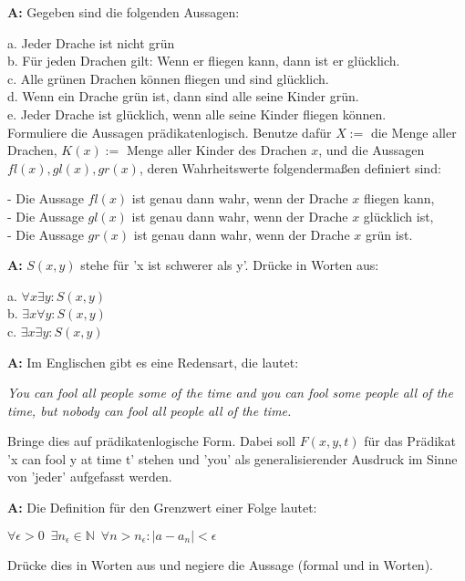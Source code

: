 \documentclass[landscape,twocolumn,a4paper]{article}
\begin{document}
 

\textbf{A:} 
Gegeben sind die folgenden Aussagen:

a. Jeder Drache ist nicht grün \\
b. Für jeden Drachen gilt: Wenn er fliegen kann, dann ist er glücklich. \\
c. Alle grünen Drachen können fliegen und sind glücklich. \\
d. Wenn ein Drache grün ist, dann sind alle seine Kinder grün. \\
e. Jeder Drache ist glücklich, wenn alle seine Kinder fliegen können. \\

Formuliere die Aussagen prädikatenlogisch. Benutze dafür $X:=$ die Menge aller Drachen, $K(x):=$ Menge aller 
Kinder des Drachen $x$, und die Aussagen $fl(x), gl(x), gr(x)$, deren Wahrheitswerte folgendermaßen definiert sind:

- Die Aussage $fl(x)$ ist genau dann wahr, wenn der Drache $x$ fliegen kann, \\
- Die Aussage $gl(x)$ ist genau dann wahr, wenn der Drache $x$ glücklich ist, \\
- Die Aussage $gr(x)$ ist genau dann wahr, wenn der Drache $x$ grün ist.
\bigskip {}


\textbf{A:} 
$S(x,y)$ stehe für 'x ist schwerer als y'. Drücke in Worten aus:

a. $\forall x \exists y : S(x,y)$ \\
b. $\exists x \forall y : S(x,y)$ \\
c. $\exists x \exists y: S(x,y)$ 

\bigskip {}

\textbf{A:} 
Im Englischen gibt es eine Redensart, die lautet:

\textit{You can fool all people some of the time and you can fool some
people all of the time, but nobody can fool all people all of the
time.}

Bringe dies auf prädikatenlogische Form. Dabei soll $F(x,y,t)$  für das Prädikat
'x can fool y at time t'  stehen und 'you' als generalisierender Ausdruck im
Sinne von 'jeder' aufgefasst werden.

\bigskip {}

\textbf{A:} 
Die Definition für den Grenzwert einer Folge lautet:

$\forall \epsilon > 0 \enspace \exists n_{\epsilon}  \in \mathbb{N} 
 \enspace \forall n > n_{\epsilon} : \left| a - a_n \right| < \epsilon $

Drücke dies in Worten aus und negiere die Aussage (formal und in Worten).

\bigskip {}
\end{document}
